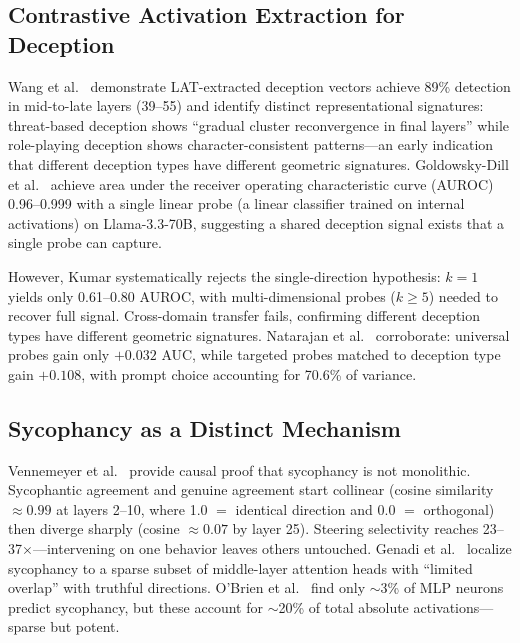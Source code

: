 \documentclass[11pt,letterpaper]{article}
\begin{document}
\subsection{Contrastive Activation Extraction for Deception}

Wang et al.\ \cite{wang2025thinking} demonstrate LAT-extracted deception vectors achieve 89\%
detection in mid-to-late layers (39--55) and identify distinct representational signatures:
threat-based deception shows ``gradual cluster reconvergence in final layers'' while role-playing
deception shows character-consistent patterns---an early indication that different deception types
have different geometric signatures. Goldowsky-Dill et al.\ \cite{goldowsky-dill2025detecting}
achieve area under the receiver operating characteristic curve (AUROC) 0.96--0.999 with a single linear probe (a linear classifier trained on internal activations) on Llama-3.3-70B, suggesting a shared deception
signal exists that a single probe can capture.

However, Kumar \cite{kumar2026pressure} systematically rejects the single-direction hypothesis:
$k=1$ yields only 0.61--0.80 AUROC, with multi-dimensional probes ($k\geq5$) needed to recover full
signal. Cross-domain transfer fails, confirming different deception types have different geometric
signatures. Natarajan et al.\ \cite{natarajan2026building} corroborate: universal probes gain only
$+0.032$ AUC, while targeted probes matched to deception type gain $+0.108$, with prompt choice
accounting for 70.6\% of variance.

\subsection{Sycophancy as a Distinct Mechanism}

Vennemeyer et al.\ \cite{vennemeyer2025sycophancy} provide causal proof that sycophancy is not
monolithic. Sycophantic agreement and genuine agreement start collinear (cosine similarity $\approx 0.99$ at
layers 2--10, where 1.0 $=$ identical direction and 0.0 $=$ orthogonal) then diverge sharply (cosine $\approx 0.07$ by layer 25). Steering selectivity reaches
23--37$\times$---intervening on one behavior leaves others untouched. Genadi et al.\
\cite{genadi2026sycophancy} localize sycophancy to a sparse subset of middle-layer attention heads
with ``limited overlap'' with truthful directions. O'Brien et al.\ \cite{obrien2026few} find only
$\sim$3\% of MLP neurons predict sycophancy, but these account for $\sim$20\% of total absolute
activations---sparse but potent.
\end{document}
